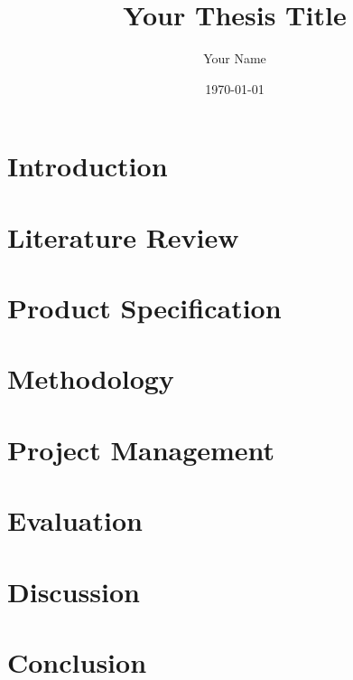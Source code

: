 \documentclass{report}
\title{Your Thesis Title}
\author{Your Name}
\date{\today}
\begin{document}
\maketitle

\begin{abstract}
\end{abstract}

\tableofcontents

\chapter{Introduction}

\chapter{Literature Review}


\chapter{Product Specification}


\chapter{Methodology}


\chapter{Project Management}

\chapter{Evaluation}


\chapter{Discussion}

\chapter{Conclusion}
\end{document}
